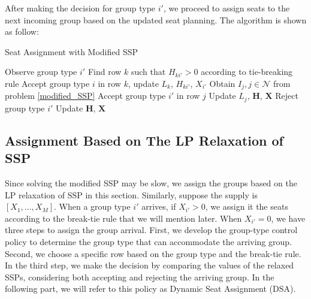 
After making the decision for group type $i{'}$, we proceed to assign seats to the next incoming group based on the updated seat planning. The algorithm is shown as follow:

\begin{algorithm}[H]
  \caption{Seat Assignment with Modified SSP}
  {Observe group type ${i{'}}$\;
    {Find row $k$ such that $H_{k{i{'}}} >0$ according to tie-breaking rule\; 
    Accept group type $i$ in row $k$, update $L_{k}$, $H_{k{i{'}}}$, $X_{i{'}}$\;}
    {{Obtain $I_{j}, j \in \mathcal{N}$ from problem \eqref{modified_SSP}\;
    {Accept group type ${i{'}}$ in row $j$\; 
    Update $L_{j}$, $\bm{H}$, $\bm{X}$\;}
    {Reject group type ${i{'}}$\; 
    Update $\bm{H}$, $\bm{X}$\;}}
    }}
\end{algorithm}

\subsection{Assignment Based on The LP Relaxation of SSP}

Since solving the modified SSP may be slow, we assign the groups based on the LP relaxation of SSP in this section. Similarly, suppose the supply is $[X_1, \ldots, X_M]$. When a group type $i{'}$ arrives, if $X_{i{'}} > 0$, we assign it the seats according to the break-tie rule that we will mention later.
When $X_{i{'}} = 0$, we have three steps to assign the group arrival. First, we develop the group-type control policy to determine the group type that can accommodate the arriving group. Second, we choose a specific row based on the group type and the break-tie rule. In the third step, we make the decision by comparing the values of the relaxed SSPs, considering both accepting and rejecting the arriving group. In the following part, we will refer to this policy as Dynamic Seat Assignment (DSA).

